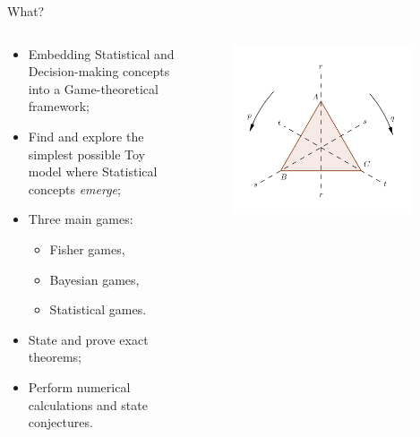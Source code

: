 \documentclass{beamer}
\theoremstyle{definition}
\begin{document}
\begin{frame}{What?}



\begin{columns}

\begin{column}{0.7\textwidth}
            
\begin{itemize}
    \item Embedding Statistical and Decision-making concepts into a Game-theoretical framework;
    \item Find and explore the simplest possible Toy model where Statistical concepts \emph{emerge};
    \item Three main games:
    \begin{itemize}
        \item Fisher games,
        \item Bayesian games,
        \item Statistical games.
    \end{itemize}
    \item State and prove exact theorems;
    \item Perform numerical calculations and state conjectures.
\end{itemize}

\end{column}

\begin{column}{0.3\textwidth}
    \begin{figure}
    \centering
        \includegraphics[width=0.95\textwidth]{img/SymmetryGroupEqTriangle_alpha.png}
    \end{figure}


\end{column}
\end{columns}
\end{frame}
\end{document}
